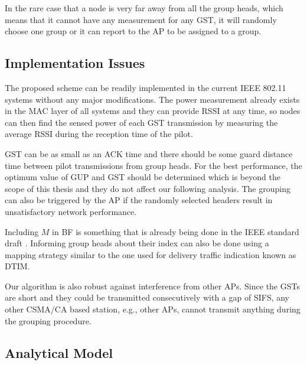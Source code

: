 In the rare case that a node is very far away from all the group heads, which means that it cannot have any measurement for any GST, it will randomly choose one group or it can report to the AP to be assigned to a group.
 


\subsection{Implementation Issues}
The proposed scheme can be readily implemented in the current IEEE 802.11 systems without any major modifications. The power measurement already exists in the MAC layer of all systems and they can provide RSSI at any time, so nodes can then find the sensed power of each GST transmission by measuring the average RSSI during the reception time of the pilot. 

GST can be as small as an ACK time and there should be some guard distance time between pilot transmissions from group heads. For the best performance, the optimum value of GUP and GST should be determined which is beyond the scope of this thesis and they do not affect our following analysis. The grouping can also be triggered by the AP if the randomly selected headers result in unsatisfactory network performance.

Including $M$ in BF is something that is already being done in the IEEE standard draft \cite{Draft80211ah}. Informing group heads about their index can also be done using a mapping strategy similar to the one used for delivery traffic indication known as DTIM.

Our algorithm is also robust against interference from other APs. Since the GSTs are short and they could be transmitted consecutively with a gap of SIFS, any other CSMA/CA based station, e.g., other APs, cannot transmit anything during the grouping procedure.

\subsection{Analytical Model}

